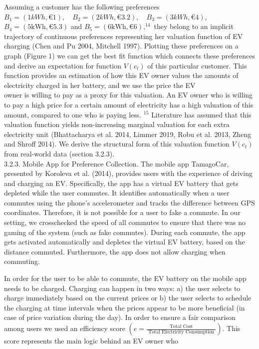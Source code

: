 \documentclass[10pt]{article}
\begin{document}
Assuming a customer has the following preferences $B_{1}=(1 k W h, € 1), \quad B_{2}=(2 k W h, € 3.2), \quad B_{3}=(3 k W h, € 4)$, $B_{4}=(5 \mathrm{kWh}, € 5.3)$ and $B_{5}=(6 \mathrm{kWh}, € 6),^{14}$ they belong to an implicit trajectory of continuous preferences representing her valuation function of EV charging (Chen and Pu 2004, Mitchell 1997). Plotting these preferences on a graph (Figure 1) we can get the best fit function which connects these preferences and derive an expectation for function $V\left(c_{t}\right)$ of this particular customer. This function provides an estimation of how this EV owner values the amounts of electricity charged in her battery, and we use the price the EV\\
owner is willing to pay as a proxy for this valuation. An EV owner who is willing to pay a high price for a certain amount of electricity has a high valuation of this amount, compared to one who is paying less. ${ }^{15}$ Literature has assumed that this valuation function yields non-increasing marginal valuation for each extra electricity unit (Bhattacharya et al. 2014, Limmer 2019, Robu et al. 2013, Zheng and Shroff 2014). We derive the structural form of this valuation function $V\left(c_{t}\right)$ from real-world data (section 3.2.3).\\
3.2.3. Mobile App for Preference Collection. The mobile app TamagoCar, presented by Koroleva et al. (2014), provides users with the experience of driving and charging an EV. Specifically, the app has a virtual EV battery that gets depleted while the user commutes. It identifies automatically when a user commutes using the phone's accelerometer and tracks the difference between GPS coordinates. Therefore, it is not possible for a user to fake a commute. In our setting, we crosschecked the speed of all commutes to ensure that there was no gaming of the system (such as fake commutes). During each commute, the app gets activated automatically and depletes the virtual EV battery, based on the distance commuted. Furthermore, the app does not allow charging when commuting.

In order for the user to be able to commute, the EV battery on the mobile app needs to be charged. Charging can happen in two ways: a) the user selects to charge immediately based on the current prices or b) the user selects to schedule the charging at time intervals when the prices appear to be more beneficial (in case of price variation during the day). In order to ensure a fair comparison among users we used an efficiency score $\left(e=\frac{\text { Total Cost }}{\text { Total Electricity Consumption }}\right)$. This score represents the main logic behind an EV owner who
\end{document}
